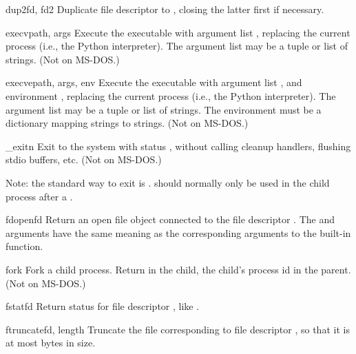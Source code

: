 \begin{funcdesc}{dup2}{fd, fd2}
Duplicate file descriptor  to , closing the latter
first if necessary.
\end{funcdesc}

\begin{funcdesc}{execv}{path, args}
Execute the executable  with argument list ,
replacing the current process (i.e., the Python interpreter).
The argument list may be a tuple or list of strings.
(Not on MS-DOS.)
\end{funcdesc}

\begin{funcdesc}{execve}{path, args, env}
Execute the executable  with argument list ,
and environment ,
replacing the current process (i.e., the Python interpreter).
The argument list may be a tuple or list of strings.
The environment must be a dictionary mapping strings to strings.
(Not on MS-DOS.)
\end{funcdesc}

\begin{funcdesc}{_exit}{n}
Exit to the system with status , without calling cleanup
handlers, flushing stdio buffers, etc.
(Not on MS-DOS.)

Note: the standard way to exit is .
 should normally only be used in the child process
after a .
\end{funcdesc}

\begin{funcdesc}{fdopen}{fd}
Return an open file object connected to the file descriptor .
The  and  arguments have the same meaning as
the corresponding arguments to the built-in  function.
\end{funcdesc}

\begin{funcdesc}{fork}{}
Fork a child process.  Return  in the child, the child's
process id in the parent.
(Not on MS-DOS.)
\end{funcdesc}

\begin{funcdesc}{fstat}{fd}
Return status for file descriptor , like .
\end{funcdesc}

\begin{funcdesc}{ftruncate}{fd, length}
Truncate the file corresponding to file descriptor , 
so that it is at most  bytes in size.
\end{funcdesc}

